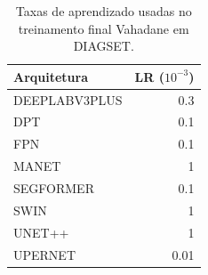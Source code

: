 \begin{table}[!htb]
\centering
\caption{Taxas de aprendizado usadas no treinamento final Vahadane em DIAGSET.}
\label{tab:results_diagset-learning-rates-vahadane}
\begin{minipage}[t]{0.52\textwidth}
\centering
\vspace{0pt}
\end{minipage}\hfill
\begin{minipage}[t]{0.40\textwidth}
\centering
\vspace{0pt}
\small
\begin{tabular}{lr}
\toprule
Arquitetura & LR ($10^{-3}$) \\
\midrule
DEEPLABV3PLUS & 0.3 \\
DPT & 0.1 \\
FPN & 0.1 \\
MANET & 1 \\
SEGFORMER & 0.1 \\
SWIN & 1 \\
UNET++ & 1 \\
UPERNET & 0.01 \\
\bottomrule
\end{tabular}
\end{minipage}
\end{table}
